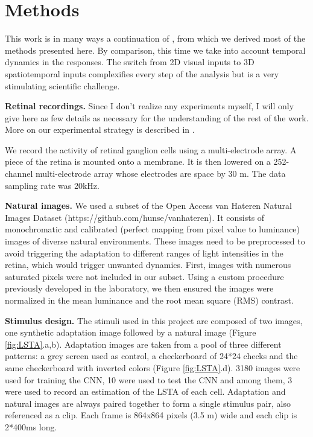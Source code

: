 \section{Methods}\label{sec:methods}

This work is in many ways a continuation of
\cite{goldin_context-dependent_2022}, from which we derived most of the methods
presented here. By comparison, this time we take into account temporal dynamics
in the responses. The switch from 2D visual inputs to 3D spatiotemporal inputs
complexifies every step of the analysis but is a very stimulating scientific
challenge.

\textbf{Retinal recordings.}
Since I don't realize any experiments myself, I will only give here as few
details as necessary for the understanding of the rest of the work. More on our
experimental strategy is described in \cite{goldin_context-dependent_2022}.

We record the activity of retinal ganglion
cells using a multi-electrode array. A piece of the retina is mounted onto a
membrane. It is then lowered on a 252-channel multi-electrode array whose
electrodes are space by 30 \textmu m.
The data sampling rate was 20kHz.

\textbf{Natural images.}
We used a subset of the Open Access van Hateren Natural Images Dataset
(https://github.com/hunse/vanhateren). It consists of monochromatic and
calibrated (perfect mapping from
pixel
value to luminance) images of diverse natural environments. These images need
to
be preprocessed to avoid triggering the adaptation to different ranges of light
intensities in the retina, which would trigger unwanted
dynamics. First, images with numerous saturated pixels were not included in our
subset. Using a custom procedure previously developed in the laboratory, we
then
ensured the images were normalized in the mean luminance and the root mean
square (RMS) contrast.

\textbf{Stimulus design.}
The stimuli used in this project are composed of two images, one synthetic
adaptation image followed by a natural image (Figure \ref{fig:LSTA}.a,b).
Adaptation images are taken from
a pool of three different patterns: a grey screen used as control,
a checkerboard of 24*24 checks and the same checkerboard with inverted colors
(Figure \ref{fig:LSTA}.d). 3180 images were used for
training the CNN, 10 were used to test the CNN and among them, 3 were used to
record an estimation of the LSTA of each cell.
Adaptation and natural images are always paired together to form a single
stimulus pair, also referenced as a clip. Each frame is 864x864 pixels (3.5
\textmu m) wide and each clip is 2*400ms long. %

